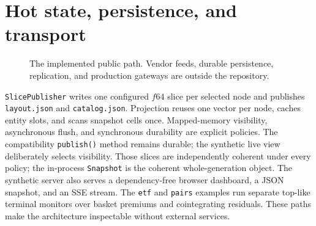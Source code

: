 \documentclass{strategynet-journal}
\begin{document}
\section{Hot state, persistence, and transport}

\begin{figure}[ht]
\centering
{}
\caption{The implemented public path.  Vendor feeds, durable persistence,
replication, and production gateways are outside the repository.}
\label{fig:system}
\end{figure}

\texttt{SlicePublisher} writes one configured \(f64\) slice per selected node
and publishes \texttt{layout.json} and \texttt{catalog.json}.  Projection
reuses one vector per node, caches entity slots, and scans snapshot cells once.
Mapped-memory visibility, asynchronous flush, and synchronous durability are
explicit policies.  The compatibility \texttt{publish()} method remains
durable; the synthetic live view deliberately selects visibility.  Those
slices are independently coherent under every policy; the in-process
\texttt{Snapshot} is the coherent whole-generation object.  The synthetic
server also serves a dependency-free
browser dashboard, a JSON snapshot, and an SSE stream.  The \texttt{etf} and
\texttt{pairs} examples run separate top-like terminal monitors over basket
premiums and cointegrating residuals.  These paths make the architecture
inspectable without external services.
\end{document}

